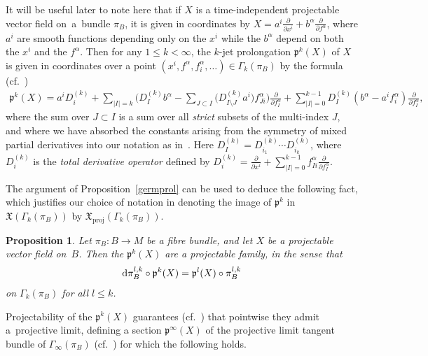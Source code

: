\documentclass[pdftex]{sigma}
\numberwithin{equation}{section}
\newtheorem{Proposition}[Theorem]{Proposition}
\def\proj{\operatorname{proj}}
\def\XF{{\mathfrak{X}}}
\def\pf{{\mathfrak{p}}}
\begin{document}
It will be useful later to note here that if $X$ is a time-independent projectable vector field on~a~bundle $\pi_{B}$, it is given in coordinates by $X = a^{i}\frac{\partial}{\partial x^{i}} + b^{\alpha}\frac{\partial}{\partial f^{\alpha}}$, where $a^{i}$ are smooth functions depending only on the $x^{i}$ while the $b^{\alpha}$ depend on both the $x^{i}$ and the $f^{\alpha}$. Then for any $1\leq k<\infty$, the $k$-jet prolongation $\pf^{k}(X)$ of $X$ is given in coordinates over a point $(x^{i},f^{\alpha},f^{\alpha}_{i},\dots)\in \Gamma_{k}(\pi_{B})$ by the formula (cf.~\cite[Theorem~2.36]{olver})
\begin{gather}\label{prolongation}
\pf^{k}(X) = a^{i}D_{i}^{(k)}+\sum_{|I|=k}\!\bigg(D^{(k)}_{I}b^{\alpha}-\sum_{J\subset I}\big(D^{(k)}_{I\setminus J}a^{i}\big)f^{\alpha}_{Ji}\bigg)\frac{\partial}{\partial f^{\alpha}_{I}}+\!\sum_{|I|=0}^{k-1}D^{(k)}_{I}(b^{\alpha}-a^{i}f^{\alpha}_{i})\frac{\partial}{\partial f^{\alpha}_{I}},
\end{gather}
where the sum over $J\subset I$ is a sum over all \textit{strict} subsets of the multi-index $J$, and where we have absorbed the constants arising from the symmetry of mixed partial derivatives into our notation as in~\cite[equation~(1.15)]{varbi}. Here $D^{(k)}_{I} = D^{(k)}_{i_{1}}\cdots D^{(k)}_{i_{k}}$, where $D^{(k)}_{i}$ is the \textit{total derivative operator} defined by $D^{(k)}_{i} = \frac{\partial}{\partial x^{i}}+\sum_{|I|=0}^{k-1}f^{\alpha}_{Ii}\frac{\partial}{\partial f^{\alpha}_{I}}$.

The argument of Proposition~\ref{germprol} can be used to deduce the following fact, which justifies our choice of notation in denoting the image of $\pf^{k}$ in $\XF(\Gamma_{k}(\pi_{B}))$ by $\XF_{\proj}(\Gamma_{k}(\pi_{B}))$.

\begin{Proposition}
Let $\pi_{B}\colon B\rightarrow M$ be a fibre bundle, and let $X$ be a projectable vector field on~$B$. Then the $\pf^{k}(X)$ are a projectable family, in the sense that
\begin{gather*}
{\rm d}\pi_{B}^{l,k}\circ \pf^{k}(X) = \pf^{l}(X)\circ\pi_{B}^{l,k}
\end{gather*}
on $\Gamma_{k}(\pi_{B})$ for all $l\leq k$.
\end{Proposition}

Projectability of the $\pf^{k}(X)$ guarantees (cf.~\cite[equation~(1.11)]{varbi}) that pointwise they admit a~pro\-jective limit, defining a section $\pf^{\infty}(X)$ of the projective limit tangent bundle of $\Gamma_{\infty}(\pi_{B})$ (cf.~\cite[Chapter One, Section B]{varbi}) for which the following holds.
\end{document}
